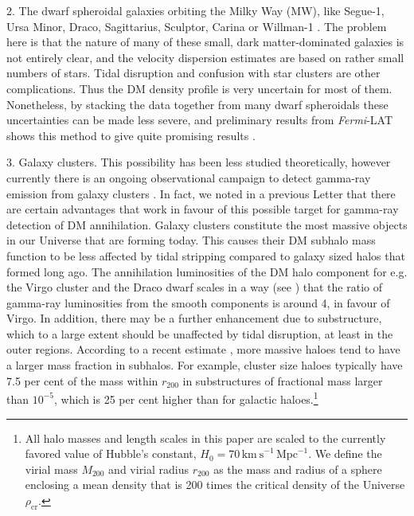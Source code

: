 \documentclass[10pt,aps,pra,reprint,amsmath,amsfonts,amssymb,showpacs,nofootinbib,floatfix]{revtex4-1}
\newcommand{\Fermi}{{\em Fermi}\xspace}
\newcommand{\rmn}{\mathrm}
\newcommand{\rvir}{r_{200}}
\newcommand{\mvir}{M_{200}}
\begin{document}
2. The dwarf spheroidal galaxies orbiting the Milky Way (MW), like
Segue-1, Ursa Minor, Draco, Sagittarius, Sculptor, Carina or Willman-1
\cite{2009JCAP...01..016B,2010ApJ...720.1174A,2010JCAP...01..031S,2010JCAP...01..031S,2011arXiv1103.0477T,2011APh....34..608H}. The
problem here is that the nature of many of these small, dark
matter-dominated galaxies is not entirely clear, and the velocity
dispersion estimates are based on rather small numbers of stars. Tidal
disruption and confusion with star clusters are other
complications. Thus the DM density profile is very uncertain for most
of them. Nonetheless, by stacking the data together from many dwarf
spheroidals these uncertainties can be made less severe, and
preliminary results from \Fermi-LAT shows this method to give quite
promising results \cite{garde}.

3. Galaxy clusters. This possibility has been less studied
theoretically, however currently there is an ongoing observational
campaign to detect gamma-ray emission from galaxy clusters
\cite{2010ApJ...710..634A,2010JCAP...05..025A,2009A&A...495...27A,2009IJMPD..18.1627D,2009A&A...502..437A,2009arXiv0907.5000G,2009ApJ...704..240K,2009ApJ...706L.275A,2010ApJ...717L..71A}. In
fact, we noted in a previous Letter \cite{2009PhRvL.103r1302P} that
there are certain advantages that work in favour of this possible
target for gamma-ray detection of DM annihilation. Galaxy clusters
constitute the most massive objects in our Universe that are forming
today. This causes their DM subhalo mass function to be less affected
by tidal stripping compared to galaxy sized halos that formed long
ago.  The annihilation luminosities of the DM halo component for
e.g. the Virgo cluster and the Draco dwarf scales in a way (see
\cite{2009PhRvL.103r1302P}) that the ratio of gamma-ray luminosities
from the smooth components is around 4, in favour of Virgo. In
addition, there may be a further enhancement due to substructure,
which to a large extent should be unaffected by tidal disruption, at
least in the outer regions.  According to a recent estimate
\cite{2011MNRAS.410.2309G}, more massive haloes tend to have a larger
mass fraction in subhalos.  For example, cluster size haloes typically
have 7.5 per cent of the mass within $r_{200}$ in substructures of
fractional mass larger than $10^{-5}$, which is 25 per cent higher
than for galactic haloes.\footnote{All halo masses and length scales
  in this paper are scaled to the currently favored value of Hubble's
  constant, $H_0 = 70\, \rmn{km~s}^{-1}\,\rmn{Mpc}^{-1}$. We define
  the virial mass $\mvir$ and virial radius $\rvir$ as the mass and
  radius of a sphere enclosing a mean density that is 200 times the
  critical density of the Universe $\rho_{\rmn{cr}}$.}
\end{document}
